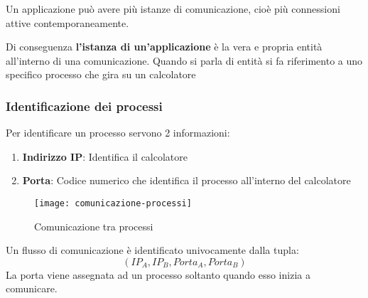 \documentclass[a4paper]{article}
\begin{document}
\vspace{1em}
\noindent
Un applicazione può avere più istanze di comunicazione, cioè più connessioni
attive contemporaneamente.

\vspace{1em}
\noindent
Di conseguenza \textbf{l'istanza di un'applicazione} è la vera e propria entità
all'interno di una comunicazione. Quando si parla di entità si fa riferimento a uno
specifico processo che gira su un calcolatore

\subsubsection{Identificazione dei processi}
Per identificare un processo servono 2 informazioni:
\begin{enumerate}
  \item \textbf{Indirizzo IP}: Identifica il calcolatore
  \item \textbf{Porta}: Codice numerico che identifica il processo all'interno del 
    calcolatore
\end{enumerate}
\begin{figure}[H]
  \centering
  \texttt{[image: comunicazione-processi]}
  \caption{Comunicazione tra processi}
\end{figure}
Un flusso di comunicazione è identificato univocamente dalla tupla:
\[
  (IP_A, IP_B, Porta_A, Porta_B)
\]
La porta viene assegnata ad un processo soltanto quando esso inizia a comunicare.
\end{document}
